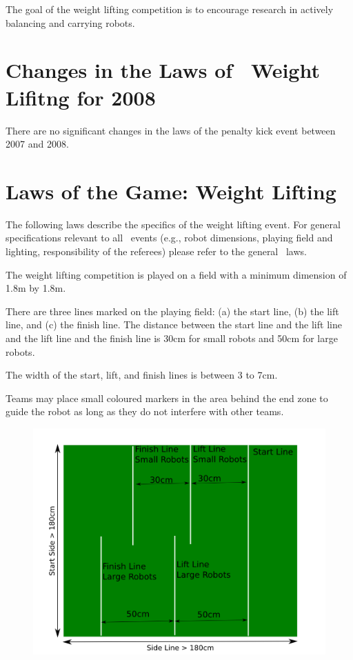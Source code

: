 \documentclass[12pt]{hurocup}
\begin{document}
The goal of the weight lifting competition is to encourage research in
actively balancing and carrying robots.

\section{Changes in the Laws of \HuroCup\ Weight Lifitng for 2008}

There are no significant changes in the laws of the penalty kick event
between 2007 and 2008.

\section{Laws of the Game: Weight Lifting}
\label{sec:weight-lifting-laws}

The following laws describe the specifics of the weight lifting
event. For general specifications relevant to all \HuroCup\ events
(e.g., robot dimensions, playing field and lighting, responsibility of
the referees) please refer to the general \HuroCup\ laws.

\label{mr-field}

\begin{lawlist}[WL]
\item The weight lifting competition is played on a field with a
minimum dimension of 1.8m by 1.8m.

\item There are three lines marked on the playing field: (a) the start line,
 (b) the lift line, and (c) the finish line. The distance between the
 start line and the lift line and the lift line and the finish line is
 30cm for small robots and 50cm for large robots.

\item The width of the start, lift, and finish lines is between 3 to 7cm.

\item Teams may place small coloured markers in the area behind the
  end zone to guide the robot as long as they do not interfere with
  other teams.

\begin{figure}
  \begin{center}
    \includegraphics[width=0.70\linewidth]{Figures/weight-lifting}
  \end{center}
\end{figure}

\end{lawlist}
\end{document}

